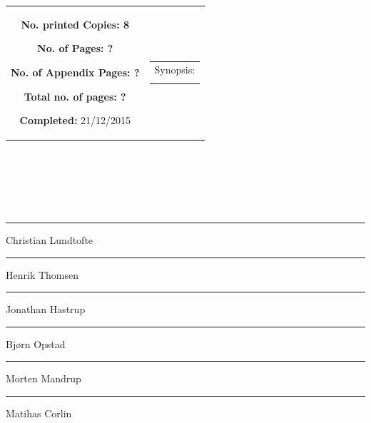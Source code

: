 {\begin{tabular}{cc}
{	\begin{description}
		\item { \textbf{No. printed Copies: 8} }
		\item { \textbf{No. of Pages: ?} } 
		\item { \textbf{No. of Appendix Pages: ?} }
		\item { \textbf{Total no. of pages: ?} } 
		\item { \textbf{Completed:} 21/12/2015}
	\end{description}
	\vfill } &
	\parbox{7cm}{
 	 \vspace{.15cm}
  	\hfill 
  	\begin{tabular}{l}
  		{ Synopsis:}\bigskip \\
  		\fbox{
  		\parbox{6.5cm}{\bigskip
     		{\vfill{\small 
     		\bigskip}}
     	}}
   	\end{tabular}}
\end{tabular}
}%
\\
\vfill
{}

\null\vfill
\begin{center}\hspace*{\fill} \\[4cm]
\begin{minipage}{0.4\textwidth}
\begin{flushleft} \large
$ $ \\[2.5cm]
{\rule{\linewidth}{0.5mm}}
Christian Lundtofte\\[2cm]
{\rule{\linewidth}{0.5mm}}
Henrik Thomsen\\[2cm]
{\rule{\linewidth}{0.5mm}}
Jonathan Hastrup\\[2cm]
\end{flushleft}
\end{minipage}
\begin{minipage}{0.4\textwidth}
\begin{flushright} \large
{\rule{\linewidth}{0.5mm}}
Bjørn Opstad\\[2cm]
{\rule{\linewidth}{0.5mm}}
Morten Mandrup\\[2cm]
{\rule{\linewidth}{0.5mm}}
Matihas Corlin\\[2cm]
\end{flushright}
\end{minipage}

\end{center}
\vfill\clearpage

%